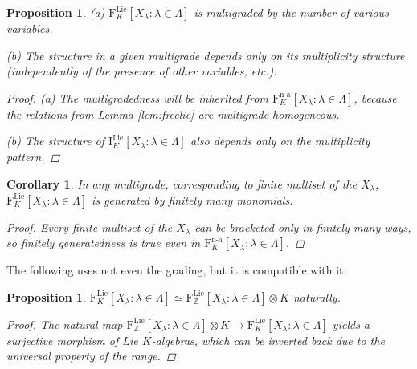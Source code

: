 \documentclass[11pt,a4paper]{amsart}
\newcommand{\plabel}[1]{ \label{#1}}
\newcommand{\plabel}[1]{ \label{#1}\rlap{\smash{${}^{^{[#1]}}$}}}
\newcommand{\plabel}[1]{ \label{#1}}
\DeclareMathOperator{\nonass}{n-a}
\DeclareMathOperator{\Lie}{Lie}
\theoremstyle{definition}
\theoremstyle{plain}
\newtheorem{prop}[point]{Proposition}
\newtheorem{cor}[point]{Corollary}
\begin{document}
\begin{prop}\plabel{prop:freelie}
(a) $\mathrm F^{\Lie}_K[X_\lambda :\lambda\in\Lambda]$ is multigraded by the number of various variables.

(b) The structure in a given multigrade depends only on its multiplicity structure
 (independently of the presence of other variables, etc.).
\begin{proof}
(a) The multigradedness will be inherited from $\mathrm F^{\nonass}_K[X_\lambda :\lambda\in\Lambda]$, because
 the relations from Lemma \ref{lem:freelie} are multigrade-homogeneous.

(b) The structure of $\mathrm I^{\Lie}_K[X_\lambda :\lambda\in\Lambda]$ also depends only
 on the multiplicity pattern.
\end{proof}
\end{prop}
\begin{cor}\plabel{cor:freelie}
In any  multigrade, corresponding to finite multiset of the $X_\lambda$,
 $\mathrm F^{\Lie}_K[X_\lambda :\lambda\in\Lambda]$ is generated by finitely many monomials.
\begin{proof}
Every finite multiset of the $X_\lambda$ can be bracketed only in finitely many ways, so finitely
 generatedness is true even in $\mathrm F^{\nonass}_K[X_\lambda :\lambda\in\Lambda]$.
\end{proof}
\end{cor}
The following uses not even the grading, but it is compatible with it:
\begin{prop}\plabel{prop:coeff}
$\mathrm F^{\Lie}_K[X_\lambda:\lambda\in\Lambda]\simeq \mathrm F^{\Lie}_{\mathbb Z}[X_\lambda:\lambda\in\Lambda]\otimes K$ naturally.
\begin{proof}
The natural map
 $\mathrm F^{\Lie}_{\mathbb Z}[X_\lambda:\lambda\in\Lambda]\otimes K\rightarrow\mathrm F^{\Lie}_K[X_\lambda:\lambda\in\Lambda]$
 yields a surjective morphism of Lie $K$-algebras, which can be inverted back due to the universal property of the range.
\end{proof}
\end{prop}
\end{document}
